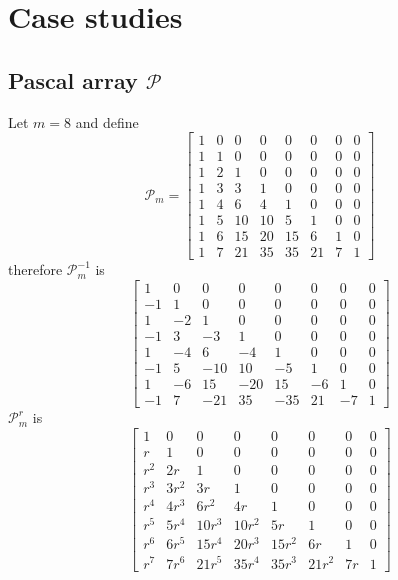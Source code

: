 \section{Case studies}

\subsection{Pascal array $\mathcal{P}$}

Let $m=8$ and define
\begin{displaymath}
\mathcal{P}_{m}=\left[\begin{matrix}1 & 0 & 0 & 0 & 0 & 0 & 0 & 0\\1 & 1 & 0 & 0 & 0 & 0 & 0 & 0\\1 & 2 & 1 & 0 & 0 & 0 & 0 & 0\\1 & 3 & 3 & 1 & 0 & 0 & 0 & 0\\1 & 4 & 6 & 4 & 1 & 0 & 0 & 0\\1 & 5 & 10 & 10 & 5 & 1 & 0 & 0\\1 & 6 & 15 & 20 & 15 & 6 & 1 & 0\\1 & 7 & 21 & 35 & 35 & 21 & 7 & 1\end{matrix}\right]
\end{displaymath}
therefore $\mathcal{P}_{m}^{-1}$ is
\begin{displaymath}
\left[\begin{matrix}1 & 0 & 0 & 0 & 0 & 0 & 0 & 0\\-1 & 1 & 0 & 0 & 0 & 0 & 0 & 0\\1 & -2 & 1 & 0 & 0 & 0 & 0 & 0\\-1 & 3 & -3 & 1 & 0 & 0 & 0 & 0\\1 & -4 & 6 & -4 & 1 & 0 & 0 & 0\\-1 & 5 & -10 & 10 & -5 & 1 & 0 & 0\\1 & -6 & 15 & -20 & 15 & -6 & 1 & 0\\-1 & 7 & -21 & 35 & -35 & 21 & -7 & 1\end{matrix}\right]
\end{displaymath}
$\mathcal{P}_{m}^{r}$ is
\begin{displaymath}
\left[\begin{matrix}1 & 0 & 0 & 0 & 0 & 0 & 0 & 0\\r & 1 & 0 & 0 & 0 & 0 & 0 & 0\\r^{2} & 2 r & 1 & 0 & 0 & 0 & 0 & 0\\r^{3} & 3 r^{2} & 3 r & 1 & 0 & 0 & 0 & 0\\r^{4} & 4 r^{3} & 6 r^{2} & 4 r & 1 & 0 & 0 & 0\\r^{5} & 5 r^{4} & 10 r^{3} & 10 r^{2} & 5 r & 1 & 0 & 0\\r^{6} & 6 r^{5} & 15 r^{4} & 20 r^{3} & 15 r^{2} & 6 r & 1 & 0\\r^{7} & 7 r^{6} & 21 r^{5} & 35 r^{4} & 35 r^{3} & 21 r^{2} & 7 r & 1\end{matrix}\right]
\end{displaymath}
